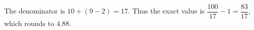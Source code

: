 The denominator is $10+(9-2)=17$. Thus the exact value is $\dfrac{100}{17}-1=\boxed{\dfrac{83}{17}}$, which rounds to $\boxed{4.88}$.
